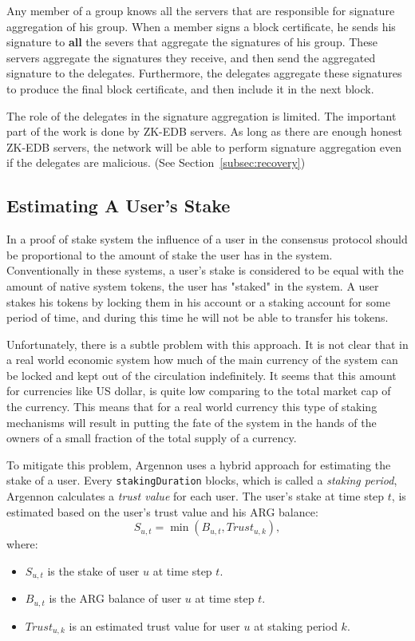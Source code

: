 Any member of a group knows all the servers that are responsible for signature aggregation of his group. When a member
signs a block certificate, he sends his signature to \textbf{all} the severs that aggregate the signatures of his group.
These servers aggregate the signatures they receive, and then send the aggregated signature to the delegates.
Furthermore, the delegates aggregate these signatures to produce the final block certificate,
and then include it in the next block.

The role of the delegates in the signature aggregation is limited. The important part of the work is done by ZK-EDB
servers. As long as there are enough honest ZK-EDB servers, the network will be able to perform signature aggregation
even if the delegates are malicious. (See Section~\ref{subsec:recovery})

\subsection{Estimating A User's Stake}\label{subsec:user's-stake}

In a proof of stake system the influence of a user in the consensus protocol should be proportional to the amount
of stake the user has in the system. Conventionally in these systems, a user's stake is considered to be equal with the
amount of native system tokens, the user has "staked" in the system. A user stakes his tokens by locking them in
his account or a staking account for some period of time, and during this time he will not be able to transfer
his tokens.

Unfortunately, there is a subtle problem with this approach. It is not clear that in a real world economic system
how much of the main currency of the system can be locked and kept out of the circulation indefinitely. It seems that
this amount for currencies like US dollar, is quite low comparing to the total market cap of the currency.
This means that for a real world currency this type of staking mechanisms will result in putting the
fate of the system in the hands of the owners of a small fraction of the total supply of a currency.

To mitigate this problem, Argennon uses a hybrid approach for estimating the stake of a user.
Every \texttt{stakingDuration} blocks, which is called a \emph{staking period}, Argennon calculates
a \emph{trust value} for each user. The user's stake
at time step \(t\), is estimated based on the user's trust value and his ARG balance:
\[
    S_{u,t} = \min (B_{u,t}, Trust_{u,k}),
\]
where:
\begin{itemize}
    \item \(S_{u,t}\) is the stake of user \(u\) at time step \(t\).
    \item \(B_{u,t}\) is the ARG balance of user \(u\) at time step \(t\).
    \item \(Trust_{u,k}\) is an estimated trust value for user \(u\) at staking period \(k\).
\end{itemize}

